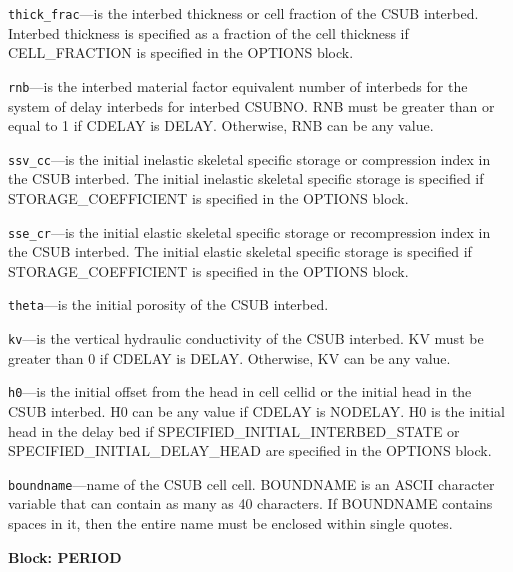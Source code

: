 \begin{description}
\item \texttt{thick\_frac}---is the interbed thickness or cell fraction of the CSUB interbed. Interbed thickness is specified as a fraction of the cell thickness if CELL\_FRACTION is specified in the OPTIONS block.

\item \texttt{rnb}---is the interbed material factor equivalent number of interbeds for the system of delay interbeds for interbed CSUBNO. RNB must be greater than or equal to 1 if CDELAY is DELAY. Otherwise, RNB can be any value.

\item \texttt{ssv\_cc}---is the initial inelastic skeletal specific storage or compression index in the CSUB interbed. The initial inelastic skeletal specific storage is specified if STORAGE\_COEFFICIENT is specified in the OPTIONS block.

\item \texttt{sse\_cr}---is the initial elastic skeletal specific storage or recompression index in the CSUB interbed. The initial elastic skeletal specific storage is specified if STORAGE\_COEFFICIENT is specified in the OPTIONS block.

\item \texttt{theta}---is the initial porosity of the CSUB interbed.

\item \texttt{kv}---is the vertical hydraulic conductivity of the CSUB interbed. KV must be greater than 0 if CDELAY is DELAY. Otherwise, KV can be any value.

\item \texttt{h0}---is the initial offset from the head in cell cellid or the initial head in the CSUB interbed. H0 can be any value if CDELAY is NODELAY. H0 is the initial head in the delay bed if SPECIFIED\_INITIAL\_INTERBED\_STATE or SPECIFIED\_INITIAL\_DELAY\_HEAD are specified in the OPTIONS block.

\item \texttt{boundname}---name of the CSUB cell cell.  BOUNDNAME is an ASCII character variable that can contain as many as 40 characters.  If BOUNDNAME contains spaces in it, then the entire name must be enclosed within single quotes.

\end{description}
\item \textbf{Block: PERIOD}


